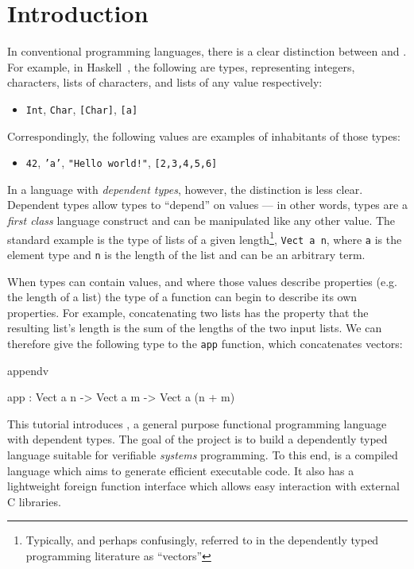 \section{Introduction}

In conventional programming languages, there is a clear distinction between
 and . For example, in Haskell~\cite{haskell-report},
the following are types, representing integers, characters, lists of characters,
and lists of any value respectively:

\begin{itemize}
\item \texttt{Int}, \texttt{Char}, \texttt{[Char]}, \texttt{[a]}
\end{itemize}

\noindent
Correspondingly, the following values are examples of inhabitants of those types:

\begin{itemize}
\item \texttt{42}, \texttt{'a'}, \texttt{"Hello world!"}, \texttt{[2,3,4,5,6]}
\end{itemize}

\noindent
In a language with \emph{dependent types}, however, the distinction is less
clear.  
Dependent types allow types to ``depend'' on values --- in other words,
types are a \emph{first class} language construct and can be manipulated like
any other value. The standard
example is the type of lists of a given length\footnote{Typically, and perhaps
confusingly, referred to in the dependently typed programming literature as
``vectors''}, \texttt{Vect a n}, where \texttt{a} is the element type and
\texttt{n} is the length of the list and can be an arbitrary
term.

When types can contain values, and where those values describe properties (e.g.
the length of a list)
the type of a function can begin to describe its own properties. For example,
concatenating two lists has the property that the resulting list's length is
the sum of the lengths of the two input lists. We can therefore give the following type 
to the  \texttt{app} function, which concatenates vectors: 

\begin{SaveVerbatim}{appendv}

app : Vect a n -> Vect a m -> Vect a (n + m)

\end{SaveVerbatim}

\noindent
This tutorial introduces \Idris{}, a general purpose functional 
programming language with dependent types.
The goal of the \Idris{} project is to build a dependently typed language suitable
for verifiable \emph{systems} programming. To this end, \Idris{} is a compiled language
which aims to generate efficient executable code. It also has a lightweight foreign
function interface which allows easy interaction with external C libraries.

